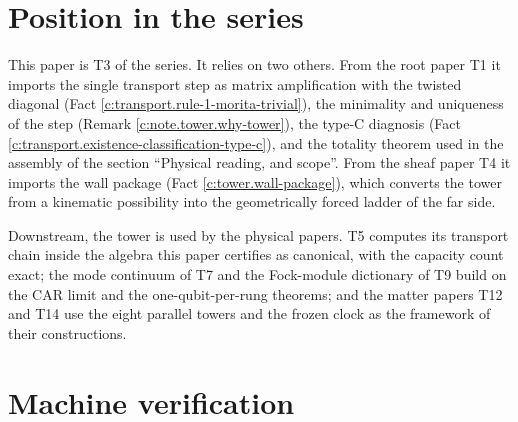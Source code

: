 \documentclass[11pt]{article}
\theoremstyle{definition}
\theoremstyle{plain}
\begin{document}
\section{Position in the series}

\label{c:note.tower.setting-position-series}
This paper is T3 of the series. It relies on two others. From the root paper T1 \cite{ButlerT1} it imports the single transport step as matrix amplification with the twisted diagonal (Fact \ref{c:transport.rule-1-morita-trivial}), the minimality and uniqueness of the step (Remark \ref{c:note.tower.why-tower}), the type-C diagnosis (Fact \ref{c:transport.existence-classification-type-c}), and the totality theorem used in the assembly of the section ``Physical reading, and scope''. From the sheaf paper T4 \cite{ButlerT4} it imports the wall package (Fact \ref{c:tower.wall-package}), which converts the tower from a kinematic possibility into the geometrically forced ladder of the far side.

Downstream, the tower is used by the physical papers. T5 \cite{ButlerT5} computes its transport chain inside the algebra this paper certifies as canonical, with the capacity count exact; the mode continuum of T7 \cite{ButlerT7} and the Fock-module dictionary of T9 \cite{ButlerT9} build on the CAR limit and the one-qubit-per-rung theorems; and the matter papers T12 \cite{ButlerT12} and T14 \cite{ButlerT14} use the eight parallel towers and the frozen clock as the framework of their constructions.

\section{Machine verification}
\end{document}

